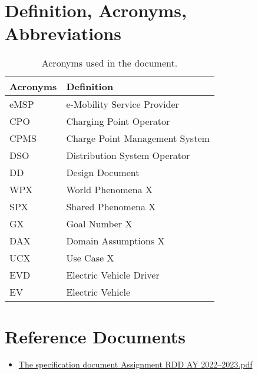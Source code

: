 \section{Definition, Acronyms, Abbreviations}
\label{sec:definition_acronyms_abbreviations}%
\begin{table}[H]
    \begin{center}
        \begin{tabular}{ |l|l| }
            \hline
            \textbf{Acronyms} & \textbf{Definition}            \\
            \hline
            eMSP              & e-Mobility Service Provider    \\
            \hline
            CPO               & Charging Point Operator        \\
            \hline
            CPMS              & Charge Point Management System \\
            \hline
            DSO               & Distribution System Operator   \\
            \hline
            DD                & Design Document                \\
            \hline
            WPX               & World Phenomena X              \\
            \hline
            SPX               & Shared Phenomena X             \\
            \hline
            GX                & Goal Number X                  \\
            \hline
            DAX               & Domain Assumptions X           \\
            \hline
            UCX               & Use Case X                     \\
            \hline
            EVD               & Electric Vehicle Driver        \\
            \hline
            EV                & Electric Vehicle               \\
            \hline
        \end{tabular}
        \caption{Acronyms used in the document.}
        \label{tab:acronyms}%
    \end{center}
\end{table}


\section{Reference Documents}
\label{sec:reference_documents}%
\begin{itemize}
    \item \href{https://polimi365-my.sharepoint.com/:b:/g/personal/10685242_polimi_it/EWPABzzjfF9EsgYvSiuvdAIBAz6qnjdfLuPE8kwQSxeyCg?e=6qasKD}{The specification document Assignment RDD AY 2022--2023.pdf}
\end{itemize}


